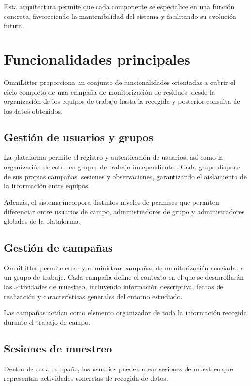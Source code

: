 Esta arquitectura permite que cada componente se especialice en una función concreta, favoreciendo la mantenibilidad del sistema y facilitando su evolución futura.


\section{Funcionalidades principales}

OmniLitter proporciona un conjunto de funcionalidades orientadas a cubrir el ciclo completo de una campaña de monitorización de residuos, desde la organización de los equipos de trabajo hasta la recogida y posterior consulta de los datos obtenidos.

\subsection{Gestión de usuarios y grupos}

La plataforma permite el registro y autenticación de usuarios, así como la organización de estos en grupos de trabajo independientes. Cada grupo dispone de sus propias campañas, sesiones y observaciones, garantizando el aislamiento de la información entre equipos.

Además, el sistema incorpora distintos niveles de permisos que permiten diferenciar entre usuarios de campo, administradores de grupo y administradores globales de la plataforma.

\subsection{Gestión de campañas}

OmniLitter permite crear y administrar campañas de monitorización asociadas a un grupo de trabajo. Cada campaña define el contexto en el que se desarrollarán las actividades de muestreo, incluyendo información descriptiva, fechas de realización y características generales del entorno estudiado.

Las campañas actúan como elemento organizador de toda la información recogida durante el trabajo de campo.

\subsection{Sesiones de muestreo}

Dentro de cada campaña, los usuarios pueden crear sesiones de muestreo que representan actividades concretas de recogida de datos.

